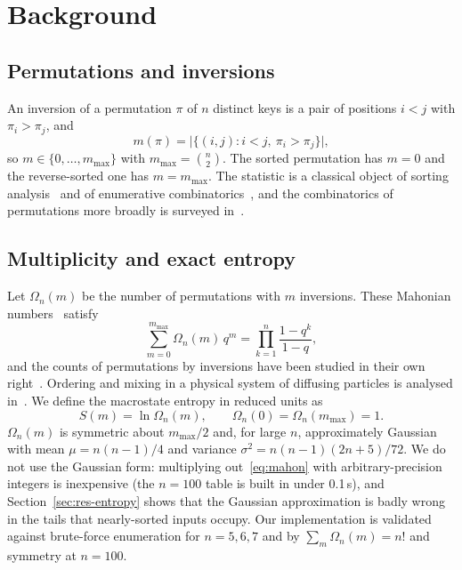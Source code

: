 \documentclass[10pt,journal]{IEEEtran}
\newcommand{\mmax}{m_{\max}}
\begin{document}
\section{Background}
\subsection{Permutations and inversions}
An inversion of a permutation $\pi$ of $n$ distinct keys is a pair of positions $i<j$ with $\pi_i>\pi_j$, and
\begin{equation}
m(\pi)=\bigl|\{(i,j):i<j,\ \pi_i>\pi_j\}\bigr|,
\label{eq:m}
\end{equation}
so $m\in\{0,\dots,\mmax\}$ with $\mmax=\binom n2$.
The sorted permutation has $m=0$ and the reverse-sorted one has $m=\mmax$. The statistic is a classical object of sorting analysis~\cite{ref1} and of enumerative combinatorics~\cite{ref14}, and the combinatorics of permutations more broadly is surveyed in~\cite{ref15}.

\subsection{Multiplicity and exact entropy}
Let $\Omega_n(m)$ be the number of permutations with $m$ inversions. These Mahonian numbers~\cite{ref13} satisfy
\begin{equation}
\sum_{m=0}^{\mmax}\Omega_n(m)\,q^m=\prod_{k=1}^{n}\frac{1-q^k}{1-q},
\label{eq:mahon}
\end{equation}
and the counts of permutations by inversions have been studied in their own right~\cite{ref16}. Ordering and mixing in a physical system of diffusing particles is analysed in~\cite{ref17}. We define the macrostate entropy in reduced units as
\begin{equation}
S(m)=\ln\Omega_n(m),\qquad \Omega_n(0)=\Omega_n(\mmax)=1 .
\label{eq:S}
\end{equation}
$\Omega_n(m)$ is symmetric about $\mmax/2$ and, for large $n$, approximately Gaussian with mean $\mu=n(n-1)/4$ and variance $\sigma^2=n(n-1)(2n+5)/72$. We do not use the Gaussian form: multiplying out~\eqref{eq:mahon} with arbitrary-precision integers is inexpensive (the $n=100$ table is built in under 0.1\,s), and Section~\ref{sec:res-entropy} shows that the Gaussian approximation is badly wrong in the tails that nearly-sorted inputs occupy. Our implementation is validated against brute-force enumeration for $n=5,6,7$ and by $\sum_m\Omega_n(m)=n!$ and symmetry at $n=100$.
\end{document}
